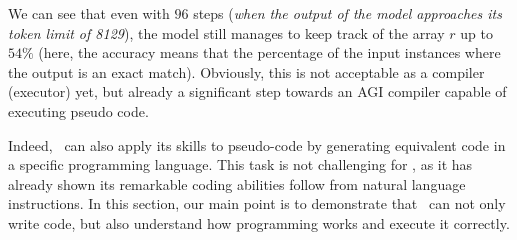We can see that even with $96$ steps (\emph{when the output of the model approaches its token limit of 8129}), the model still manages to keep track of the array $r$ up to $54 \%$ (here, the accuracy means that the percentage of the input instances where the output is an exact match). Obviously, this is not acceptable as a compiler (executor) yet, but already a significant step towards an AGI compiler capable of executing pseudo code. 

Indeed,  \DV \ can also apply its skills to pseudo-code by generating equivalent code in a specific programming language. This task is not challenging for \DV , as it has already shown its remarkable coding abilities follow from natural language instructions. In this section, our main point is to demonstrate that \DV \ can not only write code, but also understand how programming works and execute it correctly.


